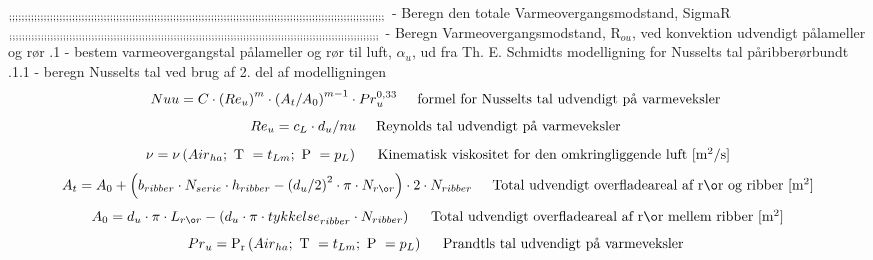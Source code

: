 \documentclass[../Hovedrapport.tex]{subfiles}
\newcommand{\F}[1]{\mbox{$#1$}}
\newcommand{\V}[1]{\mbox{$ #1 $}}
\newcommand{\I}{\mbox{\hspace{0.20in}}}
\newcommand{\prandtl}{\mathrm{P_r}}
\newcommand{\kinematicviscosity}{\mathrm{\nu}}
\begin{document}
\vspace{0.10in}
\noindent
\rm \newline
$_{;;;;;;;;;;;;;;;;;;;;;;;;;;;;;;;;;;;;;;;;;;;;;;;;;;;;;;;;;;;;;;;;;;;;;;;;;;;;;;;;;;;;;;;;;;;;;;;;;;;;;;;;;;;;;;;;;;;;;;;\newline}$
  - Beregn den totale Varmeovergangsmodstand, SigmaR\newline
 \newline
$_{;;;;;;;;;;;;;;;;;;;;;;;;;;;;;;;;;;;;;;;;;;;;;;;;;;;;;;;;;;;;;;;;;;;;;;;;;;;;;;;;;;;;;;;;;;;;;;;;;;;;;;;;;;;;;;;;;;;;;\newline}$
  - Beregn Varmeovergangsmodstand, R$_{ou}$, ved konvektion udvendigt p\aa lameller og rør\newline
 .1 - bestem varmeovergangstal p\aa lameller og rør til luft, $\alpha$$_{u}$, ud fra Th. E. Schmidts modelligning for Nusselts tal p\aa ribberørbundt\newline
 .1.1 - beregn Nusselts tal ved brug af 2. del af modelligningen
\begin{equation}
\label{EES Eqn:39}
\V{Nuu}  = C \cdot   \left( \V{Re} _{u} \right) ^{m} \cdot   \left( A_{t}/A_{0} \right) ^{m-1} \cdot  \V{Pr} _{u}^{0,33}		 
\mbox{\I formel for Nusselts tal udvendigt på varmeveksler }
\end{equation}
\begin{equation}
\label{EES Eqn:40}
\V{Re} _{u} = c_{L} \cdot  d_{u}/\V{nu		} 
\mbox{\I Reynolds tal udvendigt på varmeveksler }
\end{equation}
\begin{equation}
\label{EES Eqn:41}
\nu = \kinematicviscosity \left(\F{Air}_{ha};\mbox{\ T }= t_{Lm};\mbox{\ P }= p_{L} \right) 	 
\mbox{\I Kinematisk viskositet for den omkringliggende luft [m$^{2}$/s]}
\end{equation}
\begin{equation}
\label{EES Eqn:42}
A_{t} = A_{0} +  \left( b_{ribber}\cdot N_{serie}\cdot h_{ribber} -  \left( d_{u}/2 \right) ^{2}\cdot \pi\cdot N_{rør} \right) \cdot 2\cdot N_{ribber	} 
\mbox{\I Total udvendigt overfladeareal af rør og ribber [m$^{2}$]}
\end{equation}
\begin{equation}
\label{EES Eqn:43}
A_{0} = d_{u} \cdot  \pi \cdot  L_{rør} -  \left( d_{u} \cdot  \pi \cdot  \V{tykkelse} _{ribber} \cdot  N_{ribber} \right) 	 
\mbox{\I Total udvendigt overfladeareal af rør mellem ribber [m$^{2}$]}
\end{equation}
\begin{equation}
\label{EES Eqn:44}
\V{Pr} _{u} = \prandtl \left(\F{Air}_{ha};\mbox{\ T }= t_{Lm};\mbox{\ P }= p_{L} \right) 		 
\mbox{\I Prandtls tal udvendigt på varmeveksler }
\end{equation}
\end{document}
